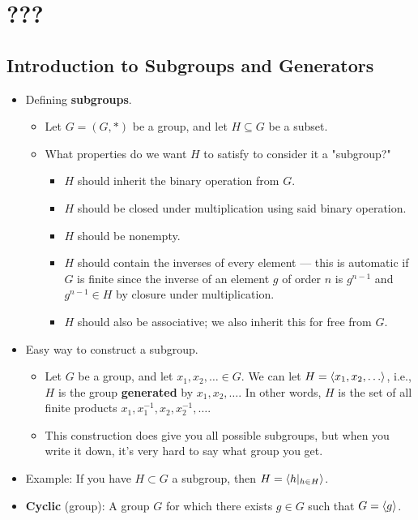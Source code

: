 \documentclass[../notes.tex]{subfiles}
\begin{document}
\chapter{???}
\section{Introduction to Subgroups and Generators}
\begin{itemize}
    \item {}Defining \textbf{subgroups}.
    \begin{itemize}
        \item Let $G=(G,*)$ be a group, and let $H\subseteq G$ be a subset.
        \item What properties do we want $H$ to satisfy to consider it a "subgroup?"
        \begin{itemize}
            \item $H$ should inherit the binary operation from $G$.
            \item $H$ should be closed under multiplication using said binary operation.
            \item $H$ should be nonempty.
            \item $H$ should contain the inverses of every element --- this is automatic if $G$ is finite since the inverse of an element $g$ of order $n$ is $g^{n-1}$ and $g^{n-1}\in H$ by closure under multiplication.
            \item $H$ should also be associative; we also inherit this for free from $G$.
        \end{itemize}
    \end{itemize}
    \item Easy way to construct a subgroup.
    \begin{itemize}
        \item Let $G$ be a group, and let $x_1,x_2,\dots\in G$. We can let $H=\left\langle{x_1,x_2,\dots}\right\rangle$, i.e., $H$ is the group \textbf{generated} by $x_1,x_2,\dots$. In other words, $H$ is the set of all finite products $x_1,x_1^{-1},x_2,x_2^{-1},\dots$.
        \item This construction does give you all possible subgroups, but when you write it down, it's very hard to say what group you get.
    \end{itemize}
    \item Example: If you have $H\subset G$ a subgroup, then $H=\left\langle{h|_{h\in H}}\right\rangle$.
    \item \textbf{Cyclic} (group): A group $G$ for which there exists $g\in G$ such that $G=\left\langle{g}\right\rangle$.

\end{itemize}
\end{document}

